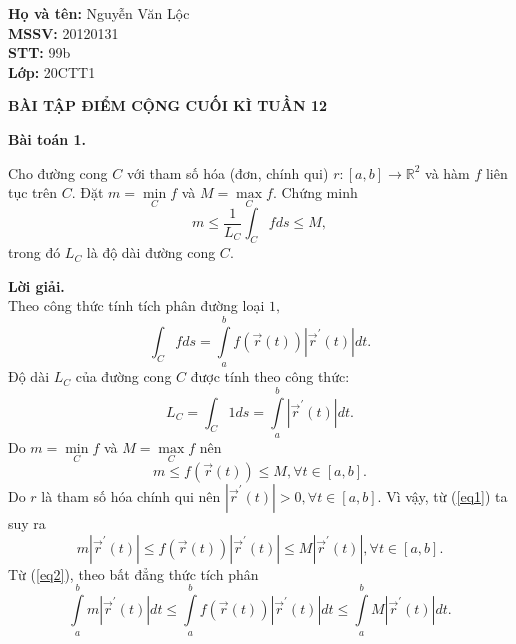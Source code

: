 \documentclass[12pt,a4paper]{article}
\author{Nguyễn Văn Lộc - 20120131}
\begin{document}
\begin{mybox}
\textbf{Họ và tên:} Nguyễn Văn Lộc\\
\textbf{MSSV:} 20120131\\
\textbf{STT:} 99b\\
\textbf{Lớp:} 20CTT1
\end{mybox}
\begin{center}
\textbf{BÀI TẬP ĐIỂM CỘNG CUỐI KÌ TUẦN 12}
\end{center}
\textbf{Bài toán 1.}
\begin{mybox}
Cho đường cong \(C\) với tham số hóa (đơn, chính qui) \(r:\left[ {a,b} \right] \to {\mathbb{R}^2}\) và hàm \(f\) liên tục trên \(C.\) Đặt \(m = \mathop {\min }\limits_C f\) và \(M = \mathop {\max }\limits_C f.\) Chứng minh 
\[m \leqslant \frac{1}{{{L_C}}}\int_C {fds}  \leqslant M,\]
trong đó \(L_C\) là độ dài đường cong \(C.\)
\end{mybox}
\textbf{Lời giải.}\\
Theo công thức tính tích phân đường loại \(1,\)
\[\int_C {fds}  = \int\limits_a^b {f\left( {\overrightarrow r \left( t \right)} \right)\left| {{{\overrightarrow r }^\prime }\left( t \right)} \right|dt} .\]
Độ dài \(L_C\) của đường cong \(C\) được tính theo công thức:
\[{L_C} = \int_C {1ds}  = \int\limits_a^b {\left| {{{\overrightarrow r }^\prime }\left( t \right)} \right|dt} .\]
Do \(m = \mathop {\min }\limits_C f\) và \(M = \mathop {\max }\limits_C f\) nên
\begin{equation}
m \leqslant f\left( {\overrightarrow r \left( t \right)} \right) \leqslant M,\forall t \in \left[ {a,b} \right].
\label{eq1}
\end{equation}
Do \(r\) là tham số hóa chính qui nên \(\left| {{{\overrightarrow r }^\prime }\left( t \right)} \right| > 0,\forall t \in \left[ {a,b} \right].\) Vì vậy, từ (\ref{eq1}) ta suy ra
\begin{equation}
m\left| {{{\overrightarrow r }^\prime }\left( t \right)} \right| \leqslant f\left( {\overrightarrow r \left( t \right)} \right)\left| {{{\overrightarrow r }^\prime }\left( t \right)} \right| \leqslant M\left| {{{\overrightarrow r }^\prime }\left( t \right)} \right|,\forall t \in \left[ {a,b} \right].
\label{eq2}
\end{equation}
Từ (\ref{eq2}), theo bất đẳng thức tích phân
\[\int\limits_a^b {m\left| {{{\overrightarrow r }^\prime }\left( t \right)} \right|dt}  \leqslant \int\limits_a^b {f\left( {\overrightarrow r \left( t \right)} \right)\left| {{{\overrightarrow r }^\prime }\left( t \right)} \right|} dt \leqslant \int\limits_a^b {M\left| {{{\overrightarrow r }^\prime }\left( t \right)} \right|dt} .\]
\end{document}
